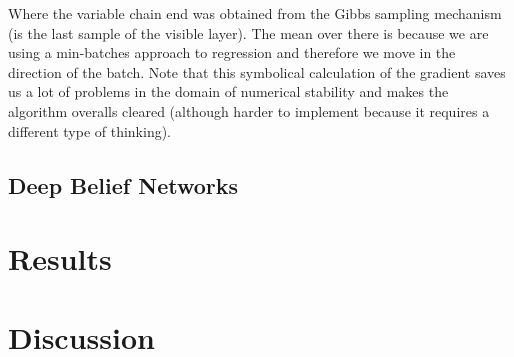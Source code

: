 \documentclass[11pt,a4paper]{article}
\begin{document}
Where the variable chain end was obtained from the Gibbs sampling mechanism (is the last sample of the visible layer). The mean over there is because we are using a min-batches approach to regression and therefore we move in the direction of the batch. Note that this symbolical calculation of the gradient saves us a lot of problems in the domain of numerical stability and makes the algorithm overalls cleared (although harder to implement because it requires a different type of thinking).

\subsection{Deep Belief Networks}




\section{Results}

\section{Discussion}



\end{document}
